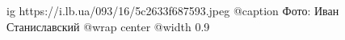  
 
 
 
 

\ifcmt
  ig https://i.lb.ua/093/16/5c2633f687593.jpeg
	@caption Фото: Иван Станиславский
  @wrap center
  @width 0.9
\fi
